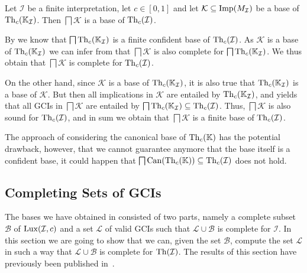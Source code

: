 \begin{Corollary}
  \label{cor:bases-of-implications-to-bases-of-gcis}
  Let $\mathcal{I}$ be a finite interpretation, let $c \in [0,1]$ and let $\mathcal{K}
  \subseteq \operatorname{Imp}(M_{\mathcal{I}})$ be a base of $\operatorname{Th}_c({\mathbb{K}}_{\mathcal{I}})$.  Then
  $\bigsqcap \mathcal{K}$ is a base of $\operatorname{Th}_c(\mathcal{I})$.
\end{Corollary}
\begin{Proof}
  By  we know that
  $\bigsqcap \operatorname{Th}_c({\mathbb{K}}_{\mathcal{I}})$ is a finite confident base of
  $\operatorname{Th}_c(\mathcal{I})$.  As $\mathcal{K}$ is a base of $\operatorname{Th}_c({\mathbb{K}}_{\mathcal{I}})$ we
  can infer from  that
  $\bigsqcap \mathcal{K}$ is also complete for $\bigsqcap \operatorname{Th}_c({\mathbb{K}}_{\mathcal{I}})$.
  We thus obtain that $\bigsqcap \mathcal{K}$ is complete for $\operatorname{Th}_c(\mathcal{I})$.

  On the other hand, since $\mathcal{K}$ is a base of $\operatorname{Th}_c({\mathbb{K}}_{\mathcal{I}})$, it is
  also true that $\operatorname{Th}_c({\mathbb{K}}_{\mathcal{I}})$ is a base of $\mathcal{K}$.  But then all
  implications in $\mathcal{K}$ are entailed by $\operatorname{Th}_c({\mathbb{K}}_{\mathcal{I}})$, and
   yields that all GCIs in
  $\bigsqcap \mathcal{K}$ are entailed by $\bigsqcap \operatorname{Th}_c({\mathbb{K}}_{\mathcal{I}}) \subseteq
  \operatorname{Th}_c(\mathcal{I})$.  Thus, $\bigsqcap \mathcal{K}$ is also sound for
  $\operatorname{Th}_c(\mathcal{I})$, and in sum we obtain that $\bigsqcap \mathcal{K}$ is a finite base
  of $\operatorname{Th}_c(\mathcal{I})$.
\end{Proof}

The approach of considering the canonical base of $\operatorname{Th}_c({\mathbb{K}})$ has the potential
drawback, however, that we cannot guarantee anymore that the base itself is a confident
base, \ie it could happen that $\bigsqcap \operatorname{Can}(\operatorname{Th}_c({\mathbb{K}})) \subseteq
\operatorname{Th}_c(\mathcal{I})$ does not hold.

\subsection{Completing Sets of GCIs}
\label{sec:completing-sets-of-gcis}

The bases we have obtained in  consisted of
two parts, namely a complete subset $\mathcal{B}$ of $\operatorname{Lux}(\mathcal{I}, c)$ and a set
$\mathcal{L}$ of valid GCIs such that $\mathcal{L} \cup \mathcal{B}$ is complete for
$\mathcal{I}$.  In this section we are going to show that we can, given the set
$\mathcal{B}$, compute the set $\mathcal{L}$ in such a way that $\mathcal{L} \cup
\mathcal{B}$ is complete for $\operatorname{Th}(\mathcal{I})$.  The results of this section have
previously been published in~\cite{Borchmann:confident-GCIs}.

